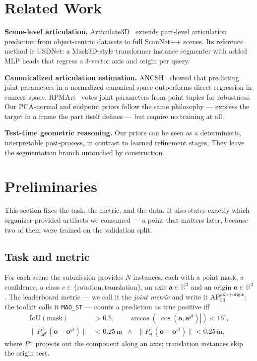 \documentclass[11pt]{article}
\newcommand{\metric}{AP$_{50}^{\text{axis+origin}}$}
\begin{document}
\section{Related Work}

\textbf{Scene-level articulation.} Articulate3D~\cite{halacheva2025articulate3d}
extends part-level articulation prediction from object-centric datasets to
full ScanNet++ scenes. Its reference method is USDNet: a Mask3D-style
transformer instance segmenter with added MLP heads that regress a
3-vector axis and origin per query.

\textbf{Canonicalized articulation estimation.}
ANCSH~\cite{li2020ancsh} showed that predicting joint parameters in a
normalized canonical space outperforms direct regression in camera space.
RPMArt~\cite{wang2024rpmart} votes joint parameters from point tuples for
robustness. Our PCA-normal and endpoint priors follow the same philosophy ---
express the target in a frame the part itself defines --- but require no
training at all.

\textbf{Test-time geometric reasoning.} Our priors can be seen as a
deterministic, interpretable post-process, in contrast to learned refinement
stages. They leave the segmentation branch untouched by construction.

\section{Preliminaries}

This section fixes the task, the metric, and the data. It also states
exactly which organizer-provided artifacts we consumed --- a point that
matters later, because two of them were trained on the validation split.

\subsection{Task and metric}

For each scene the submission provides $N$ instances, each with a point mask,
a confidence, a class $c \in \{\text{rotation}, \text{translation}\}$, an
axis $\mathbf{a} \in \mathbb{R}^3$ and an origin $\mathbf{o} \in
\mathbb{R}^3$. The leaderboard metric --- we call it the \emph{joint metric}
and write it \metric{}; the toolkit calls it \texttt{MAO\_ST} --- counts a
prediction as true positive iff
\begin{align}
\text{IoU}(\text{mask}) &> 0.5, \qquad
\arccos\!\left(|\cos(\mathbf{a}, \mathbf{a}^{gt})|\right) < 15^\circ,\\
\big\|P_{\mathbf{a}^{gt}}^{\perp}(\mathbf{o}-\mathbf{o}^{gt})\big\| &< 0.25\,\text{m}
\;\;\wedge\;\;
\big\|P_{\mathbf{a}}^{\perp}(\mathbf{o}-\mathbf{o}^{gt})\big\| < 0.25\,\text{m},
\end{align}
where $P^{\perp}$ projects out the component along an axis; translation
instances skip the origin test.
\end{document}
